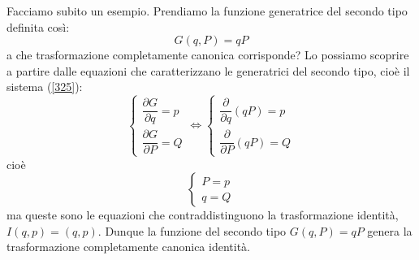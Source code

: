 \documentclass[a4paper,openany]{article}
\begin{document}
Facciamo subito un esempio. Prendiamo la funzione generatrice del secondo tipo definita così:
$$
G(q,P) = qP
$$
a che trasformazione completamente canonica corrisponde? Lo possiamo scoprire a partire dalle equazioni che caratterizzano le generatrici del secondo tipo, cioè il sistema (\ref{325}):
\begin{equation}\label{key}
	\begin{cases}
		\dfrac{\partial G}{\partial q} = p \\[6pt]
		\dfrac{\partial G}{\partial P} = Q
	\end{cases}
\iff 
	\begin{cases}
	\dfrac{\partial }{\partial q}(qP) = p \\[6pt]
	\dfrac{\partial }{\partial P}(qP) = Q
\end{cases}
\end{equation}
cioè
\begin{equation}\label{key}
	\begin{cases}
	P = p \\[6pt]
	q = Q
\end{cases}
\end{equation}
ma queste sono le equazioni che contraddistinguono la trasformazione identità, $I(q,p) = (q,p)$. Dunque la funzione del secondo tipo $G(q,P) = qP$ genera la trasformazione completamente canonica identità.
\end{document}
